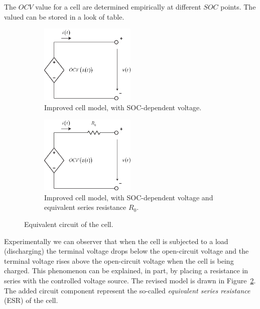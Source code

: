 \documentclass[11pt,a4paper]{article}
\numberwithin{equation}{section}
\theoremstyle{it}
\theoremstyle{definition}
\begin{document}
The $OCV$ value for a cell are determined empirically at different $SOC$ points. The valued can be stored in a look of table. 
\begin{figure}[H]
	\centering
	\begin{subfigure}{.5\textwidth}
		\centering
		\includegraphics[width = 0.5\textwidth, width = 200pt, keepaspectratio]{figures/lithium_ion_battery/cell_eq_circuit_1.eps}
		\captionsetup{width=0.75\textwidth}		
		\caption{Improved cell model, with SOC-dependent voltage.}
		\label{ocv_soc_2}
	\end{subfigure}%
	\begin{subfigure}{.5\textwidth}
		\centering
		\includegraphics[width = 0.5\textwidth, width = 200pt, keepaspectratio]{figures/lithium_ion_battery/cell_eq_circuit_2.eps}
		\captionsetup{width=0.75\textwidth}		
		\caption{Improved cell model, with SOC-dependent voltage and equivalent series resistance $R_0$.}
		\label{ocv_soc_3}
	\end{subfigure}
	\caption{Equivalent circuit of the cell.}
	\label{}
\end{figure}
Experimentally we can observer that when the cell is subjected to a load (discharging) the terminal voltage drops below the open-circuit voltage and the terminal voltage rises above the open-circuit voltage when the cell is being charged. This phenomenon can be explained, in part, by placing a resistance in series with the controlled voltage source. The revised model is drawn in Figure~\ref{ocv_soc_3}. The added circuit component represent the so-called \textit{equivalent series resistance} (ESR) of the cell.
\end{document}
